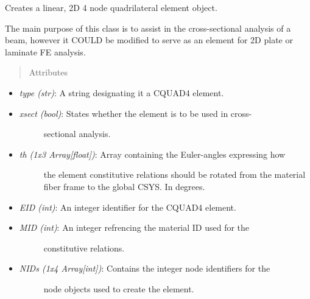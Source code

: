 \documentclass[letterpaper,10pt,english]{sphinxmanual}
\begin{document}
\begin{fulllineitems}
\label{structures:AeroComBAT.Structures.CQUAD4}
Creates a linear, 2D 4 node quadrilateral element object.

The main purpose of this class is to assist in the cross-sectional
analysis of a beam, however it COULD be modified to serve as an element for
2D plate or laminate FE analysis.
\begin{quote}\begin{description}
\item[{Attributes}] \leavevmode
\end{description}\end{quote}
\begin{itemize}
\item {} 
\emph{type (str)}: A string designating it a CQUAD4 element.

\item {} \begin{description}
\item[{\emph{xsect (bool)}: States whether the element is to be used in cross-}] \leavevmode
sectional analysis.

\end{description}

\item {} \begin{description}
\item[{\emph{th (1x3 Array{[}float{]})}: Array containing the Euler-angles expressing how}] \leavevmode
the element constitutive relations should be rotated from the
material fiber frame to the global CSYS. In degrees.

\end{description}

\item {} 
\emph{EID (int)}: An integer identifier for the CQUAD4 element.

\item {} \begin{description}
\item[{\emph{MID (int)}: An integer refrencing the material ID used for the}] \leavevmode
constitutive relations.

\end{description}

\item {} \begin{description}
\item[{\emph{NIDs (1x4 Array{[}int{]})}: Contains the integer node identifiers for the}] \leavevmode
node objects used to create the element.


\end{description}
\end{itemize}
\end{fulllineitems}
\end{document}
